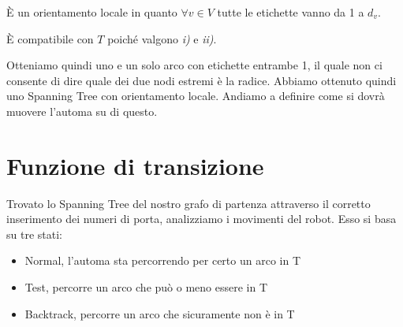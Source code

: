 È un orientamento locale in quanto $\forall v \in V$ tutte le etichette vanno da 1 a $d_v$.

È compatibile con $T$ poiché valgono \textit{i)} e \textit{ii)}.

Otteniamo quindi uno e un solo arco con etichette entrambe 1, il quale non ci consente di dire quale dei due nodi estremi è la radice.
Abbiamo ottenuto quindi uno Spanning Tree con orientamento locale. Andiamo a definire come si dovrà muovere l'automa su di questo.

\section{Funzione di transizione}
Trovato lo Spanning Tree del nostro grafo di partenza attraverso il corretto inserimento dei numeri di porta, analizziamo i movimenti del robot. Esso si basa su tre stati:
\begin{itemize}
\item Normal, l'automa sta percorrendo per certo un arco in T
\item Test, percorre un arco che può o meno essere in T
\item Backtrack, percorre un arco che sicuramente non è in T
\end{itemize}
